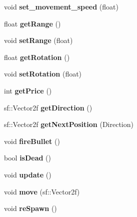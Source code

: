 \begin{DoxyCompactItemize}
\item 
\hypertarget{class_hero_a41875b39e7f93f31cd29c0c2950945b4}{void {\bfseries set\+\_\+movement\+\_\+speed} (float)}\label{class_hero_a41875b39e7f93f31cd29c0c2950945b4}

\item 
\hypertarget{class_hero_aabc334474f99665c8747a8eedd3c94bd}{float {\bfseries get\+Range} ()}\label{class_hero_aabc334474f99665c8747a8eedd3c94bd}

\item 
\hypertarget{class_hero_ac5f5f115db564fdf6ab718b18d4b9a21}{void {\bfseries set\+Range} (float)}\label{class_hero_ac5f5f115db564fdf6ab718b18d4b9a21}

\item 
\hypertarget{class_hero_a5eca3766174ff219e2b25220277a965e}{float {\bfseries get\+Rotation} ()}\label{class_hero_a5eca3766174ff219e2b25220277a965e}

\item 
\hypertarget{class_hero_a90333a509ca238dad9d20a1dfbf3db63}{void {\bfseries set\+Rotation} (float)}\label{class_hero_a90333a509ca238dad9d20a1dfbf3db63}

\item 
\hypertarget{class_hero_a80064e496c8ffa18b3cdfe04435a2c05}{int {\bfseries get\+Price} ()}\label{class_hero_a80064e496c8ffa18b3cdfe04435a2c05}

\item 
\hypertarget{class_hero_a37c1e3b13872d682281de6a6790352dd}{sf\+::\+Vector2f {\bfseries get\+Direction} ()}\label{class_hero_a37c1e3b13872d682281de6a6790352dd}

\item 
\hypertarget{class_hero_aa221ca6232816a86fd86ef1c977eb0f3}{sf\+::\+Vector2f {\bfseries get\+Next\+Position} (Direction)}\label{class_hero_aa221ca6232816a86fd86ef1c977eb0f3}

\item 
\hypertarget{class_hero_af9aa2e4d679f904dc2de1cf93ed3e988}{void {\bfseries fire\+Bullet} ()}\label{class_hero_af9aa2e4d679f904dc2de1cf93ed3e988}

\item 
\hypertarget{class_hero_a4660e87e4fc691458e6b9d4f113dc3d3}{bool {\bfseries is\+Dead} ()}\label{class_hero_a4660e87e4fc691458e6b9d4f113dc3d3}

\item 
\hypertarget{class_hero_a374195b188ba7f1cfebaecc2eeff05fc}{void {\bfseries update} ()}\label{class_hero_a374195b188ba7f1cfebaecc2eeff05fc}

\item 
\hypertarget{class_hero_a1d73bf8f019cdf000fb13a8b147230a2}{void {\bfseries move} (sf\+::\+Vector2f)}\label{class_hero_a1d73bf8f019cdf000fb13a8b147230a2}

\item 
\hypertarget{class_hero_a823076330ee3581688e5ea7427c08e59}{void {\bfseries re\+Spawn} ()}\label{class_hero_a823076330ee3581688e5ea7427c08e59}

\end{DoxyCompactItemize}
